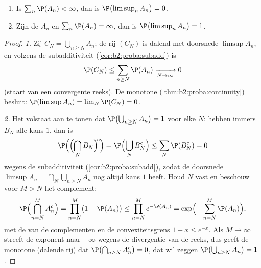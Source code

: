 \begin{theorem}\label{thm:b2:proba:borelcantelli}
\leavevmode
\begin{enumerate}
\item Is $\sum_{n} \P(A_n) < \infty$, dan is
$\P\bigl(\limsup_n A_n\bigr) = 0$.
\item Zijn de  $A_n$  en $\sum_n \P(A_n)
= \infty$, dan is $\P\bigl(\limsup_n A_n\bigr) = 1$.
\end{enumerate}
\end{theorem}

\begin{proof}
\emph{1.} Zij $C_N = \bigcup_{n \geq N}A_n$; de rij $(C_N)$ is
dalend met doorsnede $\limsup A_n$, en volgens de 
subadditiviteit (\cref{cor:b2:proba:subadd}) is
\[
\P(C_N) \leq \sum_{n \geq N}\P(A_n)
\xrightarrow[N\to\infty]{} 0
\]
(staart van een convergente reeks). De monotone 
(\cref{thm:b2:proba:continuity}) besluit: $\P(\limsup A_n) = \lim_N
\P(C_N) = 0$.

\emph{2.} Het volstaat aan te tonen dat $\P\bigl(\bigcup_{n\geq
N}A_n\bigr) = 1$ voor elke $N$: hebben immers  $B_N$
alle kans $1$, dan is
\[
\P\Bigl(\Bigl(\bigcap_NB_N\Bigr)^{\!c}\Bigr)
= \P\Bigl(\bigcup_NB_N^c\Bigr)
\leq \sum_N\P(B_N^c) = 0
\]
wegens de  subadditiviteit
(\cref{cor:b2:proba:subadd}), zodat de  doorsnede
$\limsup A_n = \bigcap_N\bigcup_{n\geq N}A_n$ nog altijd kans $1$
heeft. Houd $N$ vast en beschouw voor $M > N$ het complement:
\[
\P\Bigl(\bigcap_{n=N}^{M} A_n^c\Bigr)
= \prod_{n=N}^{M}\bigl(1 - \P(A_n)\bigr)
\leq \prod_{n=N}^{M} e^{-\P(A_n)}
= \exp\Bigl(-\sum_{n=N}^M \P(A_n)\Bigr) ,
\]
met de  van de complementen en de
convexiteitsgrens $1 - x \leq e^{-x}$. Als $M \to \infty$ streeft
de exponent naar $-\infty$ wegens de divergentie van de reeks, dus
geeft de monotone  (dalende rij) dat
$\P\bigl(\bigcap_{n \geq N}A_n^c\bigr) = 0$, dat wil zeggen
$\P\bigl(\bigcup_{n \geq N}A_n\bigr) = 1$.
\end{proof}

